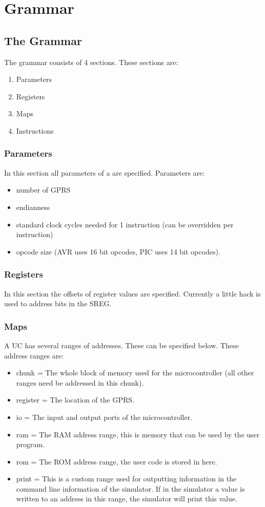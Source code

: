 \chapter{Grammar}

\section{The Grammar}
The grammar consists of 4 sections. These sections are:
\begin{enumerate}
\item Parameters
\item Registers
\item Maps
\item Instructions
\end{enumerate}

\subsection{Parameters}
In this section all parameters of a \UC are specified. Parameters are: 


\begin{itemize}
\item number of \ac{GPRS} 
\item endianness
\item standard clock cycles needed for 1 instruction (can be overridden per instruction)
\item opcode size (AVR uses 16 bit opcodes, PIC uses 14 bit opcodes).
\end{itemize} 

\subsection{Registers}
In this section the offsets of register values are specified. Currently a little hack is used to address bits in the \ac{SREG}.

\subsection{Maps}
A \ac{UC} has several ranges of addresses. These can be specified below. These address ranges are:
\begin{itemize}
\item chunk = The whole block of memory used for the microcontroller (all other ranges need be addressed in this chunk).
\item register = The location of the \ac{GPRS}.
\item io = The input and output ports of the microcontroller.
\item ram = The \ac{RAM} address range, this is memory that can be used by the user program.
\item rom = The \ac{ROM} address range, the user code is stored in here. 
\item print = This is a custom range used for outputting information in the command line information of the simulator. If in the simulator a value is written to an address in this range, the simulator will print this value.
\end{itemize}


